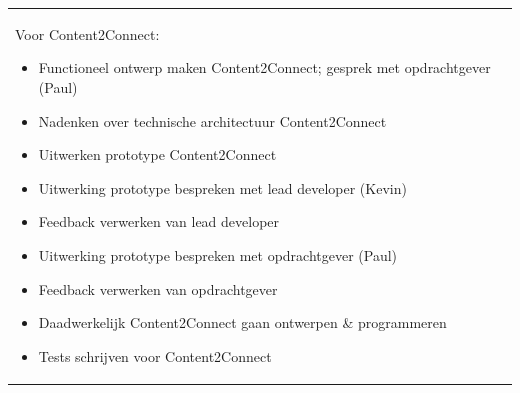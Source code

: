 \begin{tabularx}{\textwidth}{| l | X |}
Voor Content2Connect:
\begin{itemize}
\item Functioneel ontwerp maken Content2Connect; gesprek met opdrachtgever (Paul)
\item Nadenken over technische architectuur Content2Connect
\item Uitwerken prototype Content2Connect
\item Uitwerking prototype bespreken met lead developer (Kevin)
\item Feedback verwerken van lead developer
\item Uitwerking prototype bespreken met opdrachtgever (Paul)
\item Feedback verwerken van opdrachtgever
\item Daadwerkelijk Content2Connect gaan ontwerpen \& programmeren
\item Tests schrijven voor Content2Connect
\end{itemize}


\end{tabularx}
